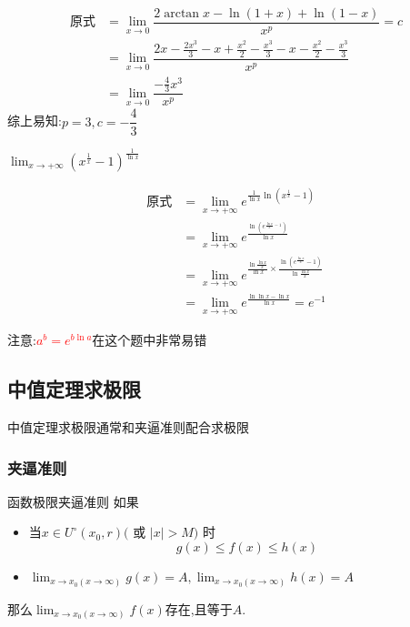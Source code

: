 \documentclass[8pt a4paper, oneside, UTF8]{ctexbook}
\begin{document}
\begin{sloppypar}
\begin{solution}
        \begin{align*}
          \text{原式} & =\lim_{x\to0} \dfrac{2\arctan x-\ln(1+x)+\ln(1-x)}{x^p}=c\\    
          & =   \lim_{x\to0} \dfrac{2x-\frac{2x^3}{3}-x+\frac{x^2}{2}-\frac{x^3}{3}-x-\frac{x^2}{2}-\frac{x^3}{3}}{x^p}\\
          & = \lim_{x\to 0}\dfrac{-\frac{4}{3}x^3}{x^p}
        \end{align*}
        综上易知:$p=3,c=-\dfrac{4}{3}$
    \end{solution}
    \begin{problem}
        $\lim_{x\to+\infty}\left(x^{\frac{1}{x}}-1\right)^{\frac{1}{\ln x}}$
    \end{problem}
    \begin{solution}
        \begin{align*}
          \text{原式} & =\lim_{x\to+\infty} e^{\frac{1}{\ln x}\ln(x^\frac{1}{x}-1)} \\
          & = \lim_{x\to+\infty} e^{\frac{\ln(e^{\frac{\ln x}{x}-1})}{\ln x}} \\
          & = \lim_{x\to+\infty} e^{\frac{\ln{\frac{\ln x}{x}}}{\ln x}\times \frac{\ln(e^\frac{\ln x}{x}-1)}{\ln\frac{\ln x}{x}}}\\
          & = \lim_{x\to+\infty} e^{\frac{\ln \ln x-\ln x}{\ln x}} = e^{-1}
        \end{align*}
    \end{solution}
    \begin{note}
        注意:\textcolor{red}{$a^b=e^{b\ln a}$}在这个题中非常易错
    \end{note}
    \subsection{中值定理求极限}
    中值定理求极限通常和夹逼准则配合求极限
    \subsubsection{夹逼准则}
    \begin{defn}{函数极限夹逼准则}{}
        如果
        \begin{itemize}
            \item 当$x\in U^{\circ}(x_{0},r)($ 或 $|x|>M)$ 时
                  $$
                      g(x)\leqslant f(x) \leqslant h(x)
                  $$
            \item $\lim_{x\to x_0(x\to\infty)}g(x)=A,\lim_{x\to x_0(x\to\infty)}h(x)=A$
        \end{itemize}
        那么$\lim_{x\to x_0(x\to\infty)}f(x)$存在,且等于$A$.
    \end{defn}

\end{sloppypar}
\end{document}
